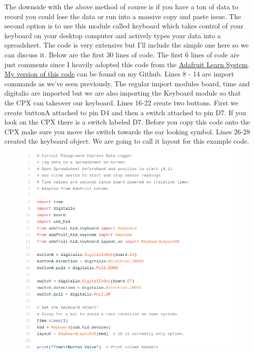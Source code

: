 The downside with the above method of course is if you have a ton of
data to record you could lose the data or run into a massive copy and
paste issue. The second option is to use this module called keyboard
which takes control of your keyboard on your desktop computer and
actively types your data into a spreadsheet. The code is very
extensive but I’ll include the simple one here so we can discuss
it. Below are the first 30 lines of code. The first 6 lines of code
are just comments since I heavily adopted this code from the \href{https://learn.adafruit.com/make-it-a-keyboard/circuitpython}{Adafruit
Learn System}. \href{https://github.com/cmontalvo251/Microcontrollers/blob/master/Circuit_Playground/CircuitPython/Data_Logging/typing/record_button_presses_typing.py}{My version of this code} can be found on my Github. Lines 8 -
14 are import commands as we’ve seen previously. The regular import
modules board, time and digitalio are imported but we are also
importing the Keyboard module so that the CPX can takeover our
keyboard. Lines 16-22 create two buttons. First we create buttonA
attached to pin D4 and then a switch attached to pin D7. If you look
on the CPX there is a switch labeled D7. Before you copy this code
onto the CPX make sure you move the switch towards the ear looking
symbol. Lines 26-28 created the keyboard object. We are going to call
it layout for this example code.
\begin{figure}[H]
  \begin{center}
    \includegraphics[width=\textwidth]{Figures/Typing1.png}
  \end{center}
\end{figure}
